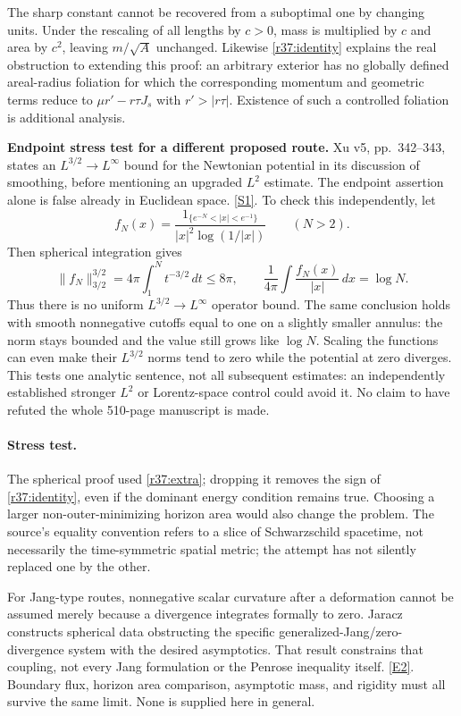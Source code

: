 \documentclass[11pt,a4paper]{article}
\newcommand{\sref}[2]{\hyperlink{source:#1:#2}{[S#2]}}
\newcommand{\eref}[2]{\hyperlink{extra:#1:#2}{[E#2]}}
\numberwithin{equation}{section}
\begin{document}
The sharp constant cannot be recovered from a suboptimal one by changing
units. Under the rescaling of all lengths by $c>0$, mass is multiplied by $c$
and area by $c^2$, leaving $m/\sqrt A$ unchanged. Likewise \eqref{r37:identity}
explains the real obstruction to extending this proof: an arbitrary exterior
has no globally defined areal-radius foliation for which the corresponding
momentum and geometric terms reduce to $\mu r'-r\tau J_s$ with
$r'>|r\tau|$. Existence of such a controlled foliation is additional analysis.

\textbf{Endpoint stress test for a different proposed route.}
Xu v5, pp.~342--343, states an $L^{3/2}\to L^\infty$ bound for the Newtonian
potential in its discussion of smoothing, before mentioning an upgraded
$L^2$ estimate. The endpoint assertion alone is false already in Euclidean
space. \sref{30006689}{1}. To check this independently, let
\[
 f_N(x)=\frac{1_{\{e^{-N}<|x|<e^{-1}\}}}
 {|x|^2\log(1/|x|)}\qquad(N>2).
\]
Then spherical integration gives
\[
 \|f_N\|_{3/2}^{3/2}=4\pi\int_1^N t^{-3/2}\,dt\le8\pi,
 \qquad \frac1{4\pi}\int\frac{f_N(x)}{|x|}\,dx=\log N.
\]
Thus there is no uniform $L^{3/2}\to L^\infty$ operator bound. The same
conclusion holds with smooth nonnegative cutoffs equal to one on a slightly
smaller annulus: the norm stays bounded and the value still grows like
$\log N$. Scaling the functions can even make their $L^{3/2}$ norms tend to
zero while the potential at zero diverges. This tests one analytic sentence,
not all subsequent estimates: an independently established stronger $L^2$
or Lorentz-space control could avoid it. No claim to have refuted the whole
510-page manuscript is made.

\paragraph{Stress test.}
The spherical proof used \eqref{r37:extra}; dropping it removes the sign of
\eqref{r37:identity}, even if the dominant energy condition remains true.
Choosing a larger non-outer-minimizing horizon area would also change the
problem. The source's equality convention refers to a slice of Schwarzschild
spacetime, not necessarily the time-symmetric spatial metric; the attempt
has not silently replaced one by the other.

For Jang-type routes, nonnegative scalar curvature after a deformation cannot
be assumed merely because a divergence integrates formally to zero. Jaracz
constructs spherical data obstructing the specific generalized-Jang/zero-
divergence system with the desired asymptotics. That result constrains that
coupling, not every Jang formulation or the Penrose inequality itself.
\eref{30006689}{2}. Boundary flux, horizon area comparison, asymptotic mass, and
rigidity must all survive the same limit. None is supplied here in general.
\end{document}
